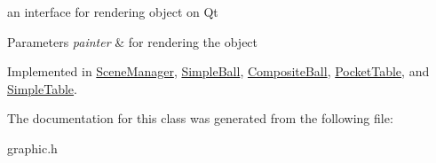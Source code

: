 an interface for rendering object on Qt 


\begin{DoxyParams}{Parameters}
{\em painter} & for rendering the object \\
\hline
\end{DoxyParams}


Implemented in \mbox{\hyperlink{class_scene_manager_a1acae2e8e78a37c3cb17c5d90a5882ca}{Scene\+Manager}}, \mbox{\hyperlink{class_simple_ball_ad775dddec77276d6f92f8aea4b487df3}{Simple\+Ball}}, \mbox{\hyperlink{class_composite_ball_a976f7cc1cec45385c0a0f81cd69c2352}{Composite\+Ball}}, \mbox{\hyperlink{class_pocket_table_ab7c2954c1723c070836b453fe0a3bf67}{Pocket\+Table}}, and \mbox{\hyperlink{class_simple_table_aabb9fe0665f1145ba620c1f6ff9b5576}{Simple\+Table}}.



The documentation for this class was generated from the following file\+:\begin{DoxyCompactItemize}
\item 
graphic.\+h\end{DoxyCompactItemize}
